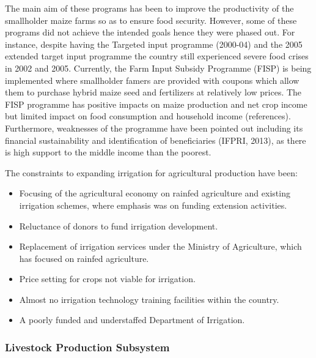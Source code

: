 \documentclass[
]{book}
\begin{document}
The main aim of these programs has been to improve the productivity of the smallholder maize farms so as to ensure food security. However, some of these programs
did not achieve the intended goals hence they were phased out. For instance, despite having the Targeted input programme (2000-04) and the 2005 extended target
input programme the country still experienced severe food crises in 2002 and 2005. Currently, the Farm Input Subsidy Programme (FISP) is being implemented where
smallholder famers are provided with coupons which allow them to purchase hybrid maize seed and fertilizers at relatively low prices. The FISP programme has
positive impacts on maize production and net crop income but limited impact on food consumption and household income (references). Furthermore, weaknesses of the
programme have been pointed out including its financial sustainability and identification of beneficiaries (IFPRI, 2013), as there is high support to the middle
income than the poorest.

The constraints to expanding irrigation for agricultural production have been:

\begin{itemize}
\item
  Focusing of the agricultural economy on rainfed agriculture and existing irrigation schemes, where emphasis was on funding extension activities.
\item
  Reluctance of donors to fund irrigation development.
\item
  Replacement of irrigation services under the Ministry of Agriculture, which has focused on rainfed agriculture.
\item
  Price setting for crops not viable for irrigation.
\item
  Almost no irrigation technology training facilities within the country.
\item
  A poorly funded and understaffed Department of Irrigation.
\end{itemize}

\hypertarget{livestock-production-subsystem}{%
\subsubsection{Livestock Production Subsystem}\label{livestock-production-subsystem}}
\end{document}
